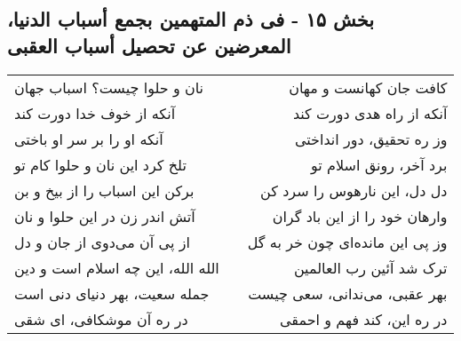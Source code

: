 \begin{center}
\section*{بخش ۱۵ - فی ذم المتهمین بجمع أسباب الدنیا، المعرضین عن تحصیل أسباب العقبی}
\label{sec:015}
\begin{longtable}{l p{0.5cm} r}
نان و حلوا چیست؟ اسباب جهان
&&
کافت جان کهانست و مهان
\\
آنکه از خوف خدا دورت کند
&&
آنکه از راه هدی دورت کند
\\
آنکه او را بر سر او باختی
&&
وز ره تحقیق، دور انداختی
\\
تلخ کرد این نان و حلوا کام تو
&&
برد آخر، رونق اسلام تو
\\
برکن این اسباب را از بیخ و بن
&&
دل دل، این نارهوس را سرد کن
\\
آتش اندر زن در این حلوا و نان
&&
وارهان خود را از این باد گران
\\
از پی آن می‌دوی از جان و دل
&&
وز پی این مانده‌ای چون خر به گل
\\
الله الله، این چه اسلام است و دین
&&
ترک شد آئین رب العالمین
\\
جمله سعیت، بهر دنیای دنی است
&&
بهر عقبی، می‌ندانی، سعی چیست
\\
در ره آن موشکافی، ای شقی
&&
در ره این، کند فهم و احمقی
\\
\end{longtable}
\end{center}
